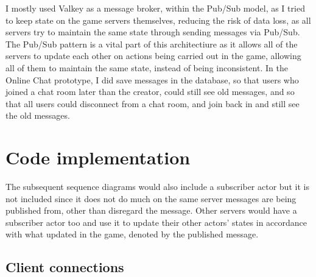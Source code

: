 \documentclass[]{final}
\begin{document}
I mostly used Valkey as a message broker, within the Pub/Sub model, as I
tried to keep state on the game servers themselves, reducing the risk of data
loss, as all servers try to maintain the same state through sending messages
via Pub/Sub. The Pub/Sub pattern is a vital part of this architectiure as it
allows all of the servers to update each other on actions being carried out
in the game, allowing all of them to maintain the same state,
instead of being inconsistent. In the Online Chat prototype,
I did save messages in the database, so that users who joined
a chat room later than the creator, could still see old messages, and so that all
users could disconnect from a chat room, and join back in and still see the old
messages.

\newpage

\section{Code implementation}

The subsequent sequence diagrams would also include a subscriber actor
but it is not included since it does not do much on the same server
messages are being published from, other than disregard the message.
Other servers would have a subscriber actor too and use it to update
their other actors' states in accordance with what updated in the game,
denoted by the published message.

\subsection{Client connections}
\end{document}
